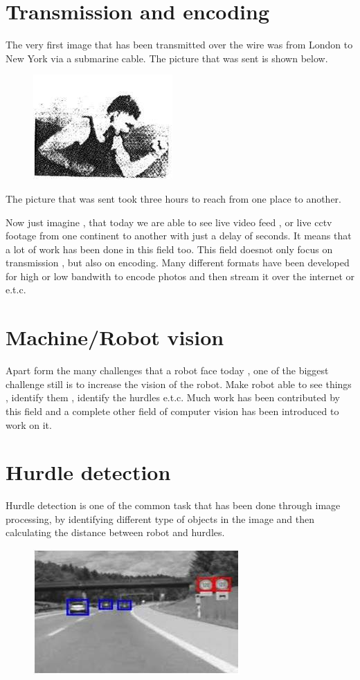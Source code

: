 \documentclass[a4paper]{article}
\begin{document}
  \section{Transmission and encoding}
The very first image that has been transmitted over the wire was from London to New York via a submarine cable. The picture that was sent is shown below.
\begin{figure}[h]
\centering
\includegraphics{pp}
\end{figure}
The picture that was sent took three hours to reach from one place to another.

Now just imagine , that today we are able to see live video feed , or live cctv footage from one continent to another with just a delay of seconds. It means that a lot of work has been done in this field too. This field doesnot only focus on transmission , but also on encoding. Many different formats have been developed for high or low bandwith to encode photos and then stream it over the internet or e.t.c.
 \section{Machine/Robot vision}
 Apart form the many challenges that a robot face today , one of the biggest challenge still is to increase the vision of the robot. Make robot able to see things , identify them , identify the hurdles e.t.c. Much work has been contributed by this field and a complete other field of computer vision has been introduced to work on it.
  
  \section{Hurdle detection}
  Hurdle detection is one of the common task that has been done through image processing, by identifying different type of objects in the image and then calculating the distance between robot and hurdles.
  \begin{figure}[h]
  \centering
  \includegraphics{mm}
  \end{figure}
  
\end{document}
